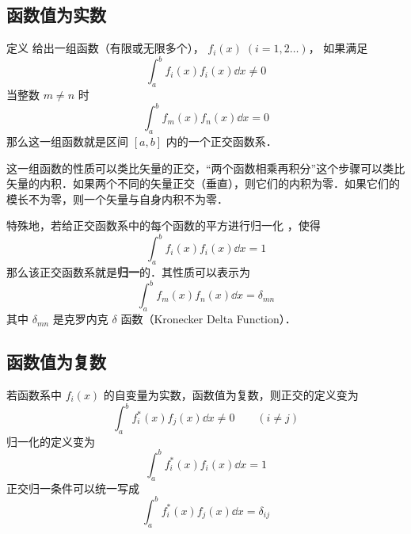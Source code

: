 
\subsection{函数值为实数}

定义
给出一组函数（有限或无限多个）， $f_i(x)\; (i = 1,2\dots)$， 如果满足
\begin{equation}
\int_a^b f_i(x) f_i(x) \dd{x} \ne 0
\end{equation} 
当整数 $m \ne n$ 时
\begin{equation}
\int_a^b f_m(x) f_n(x) \dd{x} = 0
\end{equation} 
那么这一组函数就是区间 $[a,b]$ 内的一个正交函数系．

这一组函数的性质可以类比矢量的正交，“两个函数相乘再积分”这个步骤可以类比矢量的内积．如果两个不同的矢量正交（垂直），则它们的内积为零．如果它们的模长不为零，则一个矢量与自身内积不为零．

特殊地，若给正交函数系中的每个函数的平方进行归一化%
，使得
\begin{equation}
\int_a^b f_i(x) f_i(x) \dd{x} = 1
\end{equation} 
那么该正交函数系就是\textbf{归一}的．其性质可以表示为
 \begin{equation}
\int_a^b f_m(x) f_n(x) \dd{x} = \delta_{mn}
\end{equation} 
其中 $\delta_{mn}$ 是克罗内克 $\delta$ 函数（Kronecker Delta Function）．


\subsection{函数值为复数}

若函数系中 $f_i(x)$ 的自变量为实数，函数值为复数，则正交的定义变为
 \begin{equation}
\int_a^b f_i^*(x) f_j(x) \dd{x} \ne 0 \qquad ( i \ne j )
\end{equation}    
归一化的定义变为
 \begin{equation}
\int_a^b f_i^*(x) f_i(x) \dd{x} = 1
\end{equation} 
正交归一条件可以统一写成
 \begin{equation}
\int_a^b f_i^*(x) f_j(x) \dd{x} = \delta_{ij}
\end{equation}